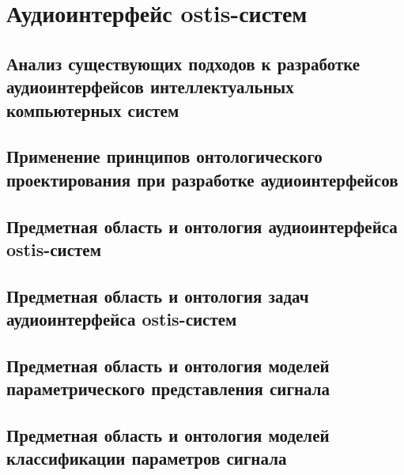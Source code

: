 \chapter{Аудиоинтерфейс ostis-систем}
\label{chapter_audio_interfaces}


\section{Анализ существующих подходов к разработке аудиоинтерфейсов интеллектуальных компьютерных систем}
\section{Применение принципов онтологического проектирования при разработке аудиоинтерфейсов}
\section{Предметная область и онтология аудиоинтерфейса ostis-систем}
\section{Предметная область и онтология задач аудиоинтерфейса ostis-систем}
\section{Предметная область и онтология моделей параметрического представления сигнала}
\section{Предметная область и онтология моделей классификации параметров сигнала}

%
